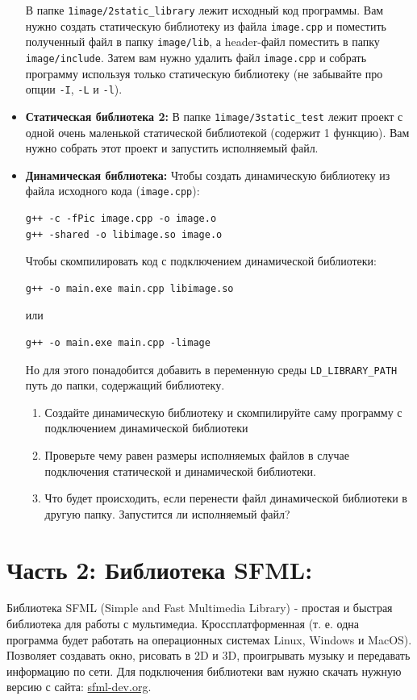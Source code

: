 \documentclass{article}
\begin{document}
\begin{itemize}
\begin{enumerate}
\begin{verbatim}
\end{verbatim}
\end{enumerate}
В папке \texttt{1image/2static\_library} лежит исходный код программы. Вам нужно создать статическую библиотеку из файла \texttt{image.cpp} и поместить полученный файл в папку \texttt{image/lib}, а header-файл поместить в папку \texttt{image/include}. Затем вам нужно удалить файл \texttt{image.cpp} и собрать программу используя только статическую библиотеку (не забывайте про опции \texttt{-I}, \texttt{-L} и \texttt{-l}).
\item \textbf{Статическая библиотека 2:} В папке \texttt{1image/3static\_test} лежит проект с одной очень маленькой статической библиотекой (содержит 1 функцию). Вам нужно собрать этот проект и запустить исполняемый файл.
\item \textbf{Динамическая библиотека:} Чтобы создать динамическую библиотеку из файла исходного кода (\texttt{image.cpp}):
\begin{verbatim}
g++ -c -fPic image.cpp -o image.o
g++ -shared -o libimage.so image.o
\end{verbatim}
Чтобы скомпилировать код с подключением динамической библиотеки:
\begin{verbatim}
g++ -o main.exe main.cpp libimage.so
\end{verbatim}
или
\begin{verbatim}
g++ -o main.exe main.cpp -limage
\end{verbatim}
Но для этого понадобится добавить в переменную среды \texttt{LD\_LIBRARY\_PATH} путь до папки, содержащий библиотеку.
\begin{enumerate}
\item Создайте динамическую библиотеку и скомпилируйте саму программу с подключением динамической библиотеки
\item Проверьте чему равен размеры исполняемых файлов в случае подключения статической и динамической библиотеки.
\item Что будет происходить, если перенести файл динамической библиотеки в другую папку. Запустится ли исполняемый файл?
\end{enumerate}
\end{itemize}

\newpage
\section*{Часть 2: Библиотека SFML:}
Библиотека SFML (Simple and Fast Multimedia Library) - простая и быстрая библиотека для работы с мультимедиа. Кроссплатформенная (т. е. одна программа будет работать на операционных системах Linux, Windows и MacOS). Позволяет создавать окно, рисовать в 2D и 3D, проигрывать музыку и передавать информацию по сети. Для подключения библиотеки вам нужно скачать нужную версию с сайта: \href{https://www.sfml-dev.org/}{sfml-dev.org}.
\end{document}
